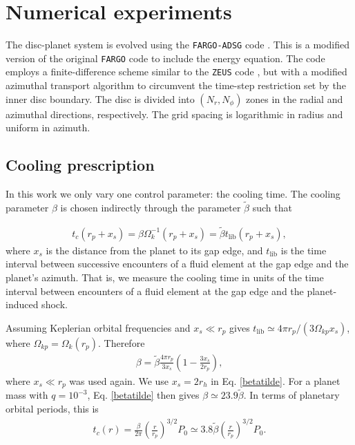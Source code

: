 \section{Numerical experiments}\label{method}
The disc-planet system is evolved using the 
\texttt{FARGO-ADSG} code \citep{baruteau08, baruteau08b}. This is a modified version 
of the original \texttt{FARGO} code \citep{masset00a} to include the energy 
equation. The code employs a finite-difference scheme similar 
to the \texttt{ZEUS} code \citep{stone92}, but with a modified azimuthal transport 
algorithm to circumvent the time-step restriction set by the inner disc boundary. 
The disc is divided into $(N_r,N_\phi)$ zones in the radial and azimuthal directions, 
respectively. The grid spacing is logarithmic in radius and uniform in azimuth.

\subsection{Cooling prescription}
In this work we only vary one control parameter: the cooling
time. %
The cooling parameter $\beta$ is chosen indirectly  through the parameter
$\tilde{\beta}$ such that 

\begin{align}
  t_c(r_p+x_s) = \beta\Omega_k^{-1}(r_p+x_s) = \tilde{\beta} t_{\mathrm{lib}}(r_p+x_s), 
\end{align}
where $x_s$ is the distance from the planet to its
gap edge, and $t_\mathrm{lib}$ is the time interval between successive
encounters of a fluid element at the gap edge and the planet's
azimuth. That is, we measure the cooling time in units of the time
interval between encounters of a fluid element at the gap edge and the
planet-induced shock. 

Assuming Keplerian orbital frequencies and $x_s\ll r_p$
gives $t_\mathrm{lib}\simeq 4\pi r_p/(3\Omega_{kp} x_s)$, where
$\Omega_{kp} = \Omega_k(r_p)$. Therefore   
\begin{align}\label{betatilde}
  \beta = \tilde{\beta} \frac{4\pi r_p}{3x_s} \left(1  - \frac{3x_s}{2r_p}\right), 
\end{align}
where $x_s\ll r_p$ was used again. We use $x_s = 2r_h$ in
Eq. \ref{betatilde}. For a planet mass with $q=10^{-3}$,
Eq. \ref{betatilde} then gives $\beta \simeq 23.9\tilde{\beta}$. In
terms of planetary orbital periods, this is
\begin{align} 
  t_c(r) = \frac{\beta}{2\pi}\left(\frac{r}{r_p}\right)^{3/2}P_0\simeq
  3.8 \tilde{\beta}\left(\frac{r}{r_p}\right)^{3/2}P_0. 
\end{align}

